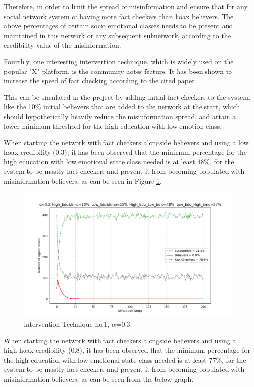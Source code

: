 \documentclass[twocolumn, a4paper, 12pt]{article}
\begin{document}
Therefore, in order to limit the spread of misinformation and ensure that for any social network system of having more fact checkers than hoax believers. The above percentages of certain socio emotional classes needs to be present and maintained in this network or any subsequent subnetwork, according to the credibility value of the misinformation.

Fourthly, one interesting intervention technique, which is widely used on the popular "X" platform, is the community notes feature. It has been shown to increase the speed of fact checking according to the cited paper \cite{community_notes}.

This can be simulated in the project by adding initial fact checkers to the system, like the 10\% initial believers that are added to the network at the start, which should hypothetically heavily reduce the misinformation spread, and attain a lower minimum threshold for the high education with low emotion class.

When starting the network with fact checkers alongside believers and using a low hoax credibility (0.3), it has been observed that the minimum percentage for the high education with low emotional state class needed is at least 48\%, for the system to be mostly fact checkers and prevent it from becoming populated with misinformation believers, as can be seen in Figure \ref{fig:9}.

\begin{figure}[H]
    \centering
    \includegraphics[width=1\linewidth]{intervention_low_alpha.png}
    \caption{Intervention Technique no.1, $\alpha$=0.3}
    \label{fig:9}
\end{figure}

When starting the network with fact checkers alongside believers and using a high hoax credibility (0.8), it has been observed that the minimum percentage for the high education with low emotional state class needed is at least 77\%, for the system to be mostly fact checkers and prevent it from becoming populated with misinformation believers, as can be seen from the below graph.
\end{document}
